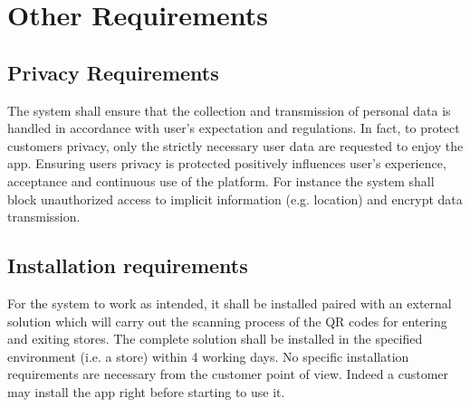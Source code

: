\section{Other Requirements}

\subsection{Privacy Requirements}\label{req:privacy}
The system shall ensure that the collection and transmission of personal data is handled in accordance with user’s expectation and regulations.\newline
In fact, to protect customers privacy, only the strictly necessary user data are requested to enjoy the app. Ensuring users privacy is protected positively influences user’s experience, acceptance and continuous use of the platform. For instance the system shall block unauthorized access to implicit information (e.g. location) and encrypt data transmission.

\subsection{Installation requirements}
For the system to work as intended, it shall be installed paired with an external solution which will carry out the scanning process of the QR codes for entering and exiting stores.\newline
The complete solution shall be installed in the specified environment (i.e. a store) within 4 working days.\newline
No specific installation requirements are necessary from the customer point of view. Indeed a customer may install the app right before starting to use it.
